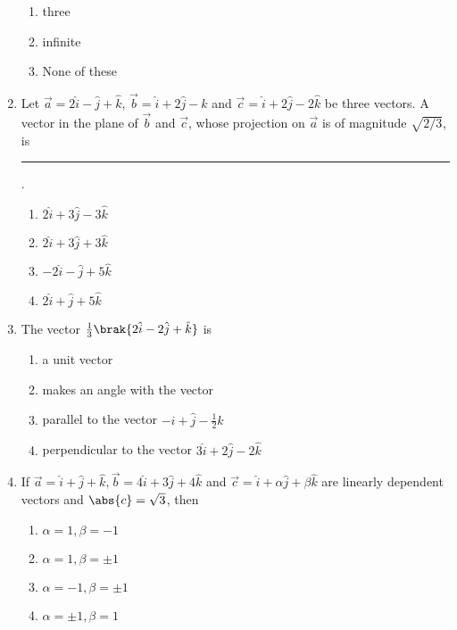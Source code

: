 \begin{enumerate}[label=\thesubsection.\arabic*.,ref=\thesubsection.\theenumi]
\begin{multicols}{4}
\begin{enumerate}
			\item three
			\item infinite
			\item None of these
		\end{enumerate}
  \end{multicols}
\item %
	Let $\vec{a}=2\hat{i}-\hat{j}+\hat{k}$, $\vec{b}=\hat{i}+2\hat{j}-\hat{k}$ and $\vec{c}=\hat{i}+2\hat{j}-2\hat{k}$ be three vectors. A vector in the plane of $\vec{b}$ and $\vec{c}$, whose projection on $\vec{a}$ is of magnitude $\sqrt{2/3}$, is
\rule{1cm}{0.01pt}.
	 \hfill {}
  \begin{multicols}{4}
		\begin{enumerate}
			\item $2\hat{i}+3\hat{j}-3\hat{k}$
			\item $2\hat{i}+3\hat{j}+3\hat{k}$
			\item $-2\hat{i}-\hat{j}+5\hat{k}$
			\item $2\hat{i}+\hat{j}+5\hat{k}$
		\end{enumerate}
  \end{multicols}
\item %
	The vector $\frac{1}{3}\brak{2\hat{i}-2\hat{j}+\hat{k}}$ is \hfill{}\\
  \begin{multicols}{2}
		\begin{enumerate}
			\item a unit vector
			\item makes an angle with the vector
			\item parallel to the vector $-\hat{i}+\hat{j}-\frac{1}{2}\hat{k}$
			\item perpendicular to the vector $3\hat{i}+2\hat{j}-2\hat{k}$
                \end{enumerate}
  \end{multicols}
\item %
	If $\vec{a}=\hat{i}+\hat{j}+\hat{k}, \vec{b}=4\hat{i}+3\hat{j}+4\hat{k}$ and $\vec{c}=\hat{i}+\alpha\hat{j}+\beta\hat{k}$ are linearly dependent vectors and $\abs{c}=\sqrt{3}$, then \hfill {}
  \begin{multicols}{2}
		\begin{enumerate}
			\item $\alpha=1,\beta=-1$
			\item $\alpha=1,\beta=\pm1$
			\item $\alpha=-1,\beta=\pm1$
			\item $\alpha=\pm1,\beta=1$

\end{enumerate}
\end{multicols}
\end{enumerate}

